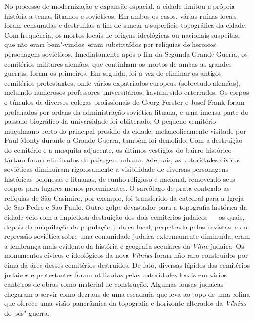 No processo de modernização e expansão espacial, a cidade
limitou a própria história a temas lituanos e soviéticos. Em ambos os
casos, várias ruínas locais foram censuradas e destruídas a fim de
sanear a superfície topográfica da cidade. Com frequência, os mortos
locais de origens ideológicas ou nacionais suspeitas, que não eram
bem"-vindos, eram substituídos por relíquias de heroicos personagens
soviéticos. Imediatamente após o fim da Segunda Grande Guerra, os
cemitérios militares alemães, que continham os mortos de ambas as
grandes guerras, foram os primeiros. Em seguida, foi a vez de eliminar
os antigos cemitérios protestantes, onde vários expatriados europeus
(sobretudo alemães), incluindo numerosos professores universitários,
haviam sido enterrados. Os corpos e túmulos de diversos colegas
profissionais de Georg Forster e Josef Frank foram profanados por ordens
da administração soviética lituana, e uma imensa parte do passado
biográfico da universidade foi obliterado. O pequeno cemitério muçulmano
perto do principal presídio da cidade, melancolicamente visitado por
Paul Monty durante a Grande Guerra, também foi demolido. Com a
destruição do cemitério e a mesquita adjacente, os últimos vestígios do
bairro histórico tártaro foram eliminados da paisagem urbana. Ademais,
as autoridades cívicas soviéticas diminuíram rigorosamente a
visibilidade de diversas personagens históricas polonesas e lituanas, de
cunho religioso e nacional, removendo seus corpos para lugares menos
proeminentes. O sarcófago de prata contendo as relíquias de São
Casimiro, por exemplo, foi transferido da catedral para a Igreja de São
Pedro e São Paulo. Outro golpe devastador para a topografia histórica da
cidade veio com a impiedosa destruição dos dois cemitérios judaicos --- os
quais, depois da aniquilação da população judaica local, perpetrada
pelos nazistas, e da repressão soviética sobre uma comunidade judaica
extremamente diminuída, eram a lembrança mais evidente da história e
geografia seculares da \textit{Vilne} judaica. Os monumentos cívicos e
ideológicos da nova \textit{Vilnius} foram não raro construídos por cima da área
desses cemitérios destruídos. De fato, diversas lápides dos cemitérios
judaicos e protestantes foram utilizadas pelas autoridades locais em
vários canteiros de obras como material de construção. Algumas lousas
judaicas chegaram a servir como degraus de uma escadaria que leva ao
topo de uma colina que oferece uma visão panorâmica da topografia e
horizonte alterados da \textit{Vilnius} do pós"-guerra.

%

